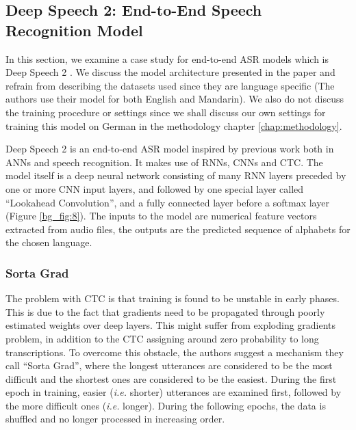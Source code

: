 \subsection{Deep Speech 2: End-to-End Speech Recognition Model} 
\label{bg:s3_sub3}

In this section, we examine a case study for end-to-end \ac{ASR} models which is Deep Speech 2 \cite{amodei2016deep}. We discuss the model architecture presented in the paper and refrain from describing the datasets used since they are language specific (The authors use their model for both English and Mandarin). We also do not discuss the training procedure or settings since we shall discuss our own settings for training this model on German in the methodology chapter \ref{chap:methodology}.


Deep Speech 2 is an end-to-end \ac{ASR} model inspired by previous work both in \ac{ANN}s and speech recognition. It makes use of \ac{RNN}s, \ac{CNN}s and \ac{CTC}. The model itself is a deep neural network consisting of many \ac{RNN} layers preceded by one or more \ac{CNN} input layers, and followed by one special layer called \enquote{Lookahead Convolution}, and a fully connected layer before a softmax layer (Figure \ref{bg_fig:8}). The inputs to the model are numerical feature vectors extracted from audio files, the outputs are the predicted sequence of alphabets for the chosen language.

\subsubsection{Sorta Grad}
\label{bg:s3_sub3_subsub1}

The problem with \ac{CTC} is that training is found to be unstable in early phases. This is due to the fact that gradients need to be propagated through poorly estimated weights over deep layers. This might suffer from exploding gradients problem, in addition to the \ac{CTC} assigning around zero probability to long transcriptions. To overcome this obstacle, the authors suggest a mechanism they call \enquote{Sorta Grad}, where the longest utterances are considered to be the most difficult and the shortest ones are considered to be the easiest. During the first epoch in training, easier (\textit{i.e.} shorter) utterances are examined first, followed by the more difficult ones (\textit{i.e.} longer). During the following epochs, the data is shuffled and no longer processed in increasing order.

